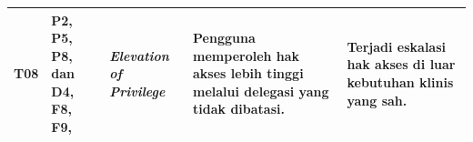 {\begin{longtable}{|p{0.65cm}|p{2.2cm}|p{1.9cm}|p{4cm}|p{4cm}|}
	T08                                                                                                                                                                         &
	P2, P5, P8, dan D4, F8, F9,                                                                                                                                                 &
	\textit{Elevation of Privilege}                                                                                                                                             &
	Pengguna memperoleh hak akses lebih tinggi melalui delegasi yang tidak dibatasi.                                                                                            &
	Terjadi eskalasi hak akses di luar kebutuhan klinis yang sah.                                                                                                                                                                                                            \\
	\hline
\end{longtable}
}





